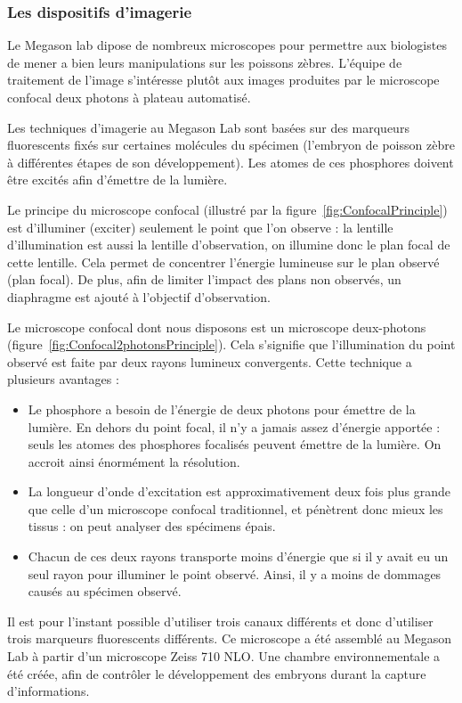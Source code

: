 \subsubsection{Les dispositifs d'imagerie}


Le Megason lab dipose de nombreux microscopes pour permettre aux biologistes de mener a bien leurs manipulations sur les poissons zèbres.
L'équipe de traitement de l'image s'intéresse plutôt aux images produites par le microscope confocal deux photons à plateau automatisé. 

Les techniques d'imagerie au Megason Lab sont basées sur des marqueurs fluorescents fixés sur certaines molécules du spécimen (l'embryon de poisson zèbre à différentes étapes de son développement). Les atomes de ces phosphores doivent être excités afin d'émettre de la lumière.


Le principe du microscope confocal (illustré par la figure~\ref{fig:ConfocalPrinciple}) est d'illuminer (exciter) seulement le point que l'on observe : la lentille d'illumination est aussi la lentille d'observation, on illumine donc le plan focal de cette lentille. Cela permet de concentrer l'énergie lumineuse sur le plan observé (plan focal). De plus, afin de limiter l'impact des plans non observés, un diaphragme est ajouté à l'objectif d'observation.

Le microscope confocal dont nous disposons est un microscope deux-photons (figure~\ref{fig:Confocal2photonsPrinciple}).
Cela s'signifie que l'illumination du point observé est faite par deux rayons lumineux convergents.
Cette technique a plusieurs avantages :
\begin{itemize}
  \item Le phosphore a besoin de l'énergie de deux photons pour émettre de la lumière. En dehors du point focal, il n'y a jamais assez d'énergie apportée : seuls les atomes des phosphores focalisés peuvent émettre de la lumière. On accroit ainsi énormément la résolution.
  \item La longueur d'onde d'excitation est approximativement deux fois plus grande que celle d'un microscope confocal traditionnel, et pénètrent donc mieux les tissus : on peut analyser des spécimens épais.
  \item Chacun de ces deux rayons transporte moins d'énergie que si il y avait eu un seul rayon pour illuminer le point observé.
  Ainsi, il y a moins de dommages causés au spécimen observé.
\end{itemize}

Il est pour l'instant possible d'utiliser trois canaux différents et donc d'utiliser trois marqueurs fluorescents différents.
Ce microscope a été assemblé au Megason Lab à partir d'un microscope Zeiss 710 NLO.
Une chambre environnementale a été créée, afin de contrôler le développement des embryons durant la capture d'informations.

